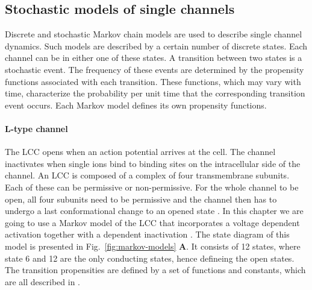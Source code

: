 \subsection*{Stochastic models of single channels}
\label{sec:stochastic-models}
Discrete and stochastic Markov chain models are used to describe single channel dynamics. Such models are described by a certain number of discrete states. Each channel can be in either one of these states. A transition between two states is a stochastic event. The frequency of these events are determined by the propensity functions associated with each transition. These functions, which may vary with time, characterize the probability per unit time that the corresponding transition event occurs. Each Markov model defines its own propensity functions. \par

\paragraph*{L-type \Ca channel}
\label{sec:lcc}
The LCC opens when an action potential arrives at the cell. The channel inactivates when single \Ca ions bind to binding sites on the intracellular side of the channel. An LCC is composed of a complex of four transmembrane subunits. Each of these can be permissive or non-permissive. For the whole channel to be open, all four subunits need to be permissive and the channel then has to undergo a last conformational change to an opened state \cite{Hille2001}. In this chapter we are going to use a Markov model of the LCC that incorporates a voltage dependent activation together with a \Ca dependent inactivation \cite{JafriRiceEtAl1998,Gree_2002_2918}. The state diagram of this model is presented in Fig.~\ref{fig:markov-models} \textbf{A}. It consists of 12 states, where state 6 and 12 are the only conducting states, hence defineing the open states. The transition propensities are defined by a set of functions and constants, which are all described in \citet{GreensteinWinslow2002}.\par

